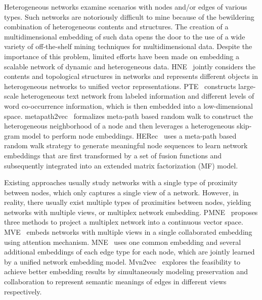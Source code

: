 \documentclass[sigconf]{acmart}
\begin{document}
Heterogeneous networks examine scenarios with nodes and/or edges of various types. Such networks are notoriously difficult to mine because of the bewildering combination of heterogeneous contents and structures. The creation of a multidimensional embedding of such data opens the door to the use of a wide variety of off-the-shelf mining techniques for multidimensional data. Despite the importance of this problem, limited efforts have been made on embedding a scalable network of dynamic and heterogeneous data. HNE~\cite{chang2015heterogeneous} jointly considers the contents and topological structures in networks and represents different objects
in heterogeneous networks to unified vector representations. PTE~\cite{tang2015pte} constructs large-scale heterogeneous text network from  labeled information and different levels of word co-occurrence information, which is then embedded into a low-dimensional space. 
metapath2vec~\cite{dong2017metapath2vec} formalizes meta-path based random walk to construct the heterogeneous neighborhood of a node and then leverages a heterogeneous skip-gram model to perform node embeddings. 
HERec~\cite{shi2018heterogeneous} uses a meta-path based random walk strategy to generate meaningful node sequences to learn network embeddings that are first transformed by a set of fusion functions and subsequently integrated into an extended matrix factorization (MF) model.


Existing approaches usually study networks with a single type of proximity between nodes, which only captures a single view of a network. However, in reality, there usually exist multiple types of proximities between nodes, yielding networks with multiple views, or multiplex network embedding. PMNE~\cite{liu2017principled} proposes three 
methods to project a multiplex network into a continuous vector space. MVE~\cite{qu2017attention} embeds networks with multiple views in a single collaborated embedding using attention mechanism. 
MNE~\cite{ijcai2018-428} uses one common embedding and several additional embeddings of each edge type for each node, which are jointly learned by a unified network embedding model.
Mvn2vec~\cite{shi2018mvn2vec} explores the feasibility to achieve better embedding results by simultaneously modeling preservation and collaboration to represent semantic meanings of edges in different views respectively. 
 
\end{document}
